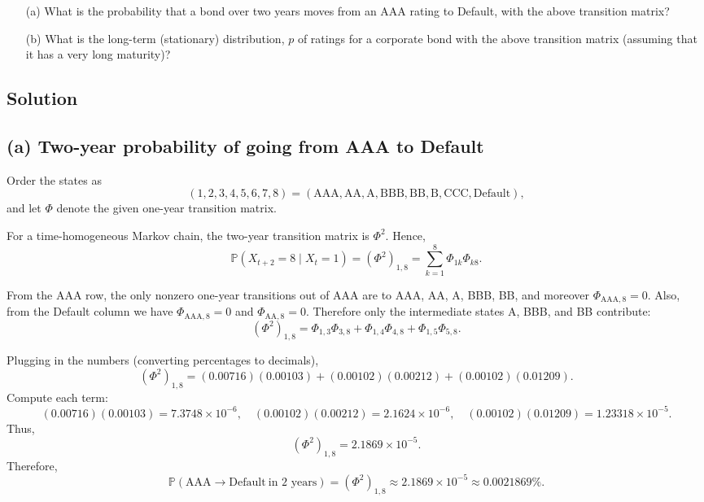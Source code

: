 \documentclass{article}
\begin{document}
\begin{enumerate}

\item[(a)] What is the probability that a bond over two years moves from an AAA rating to Default, with the above transition matrix?

\item[(b)] What is the long-term (stationary) distribution, $p$ of ratings for a corporate bond with the above transition matrix (assuming that it has a very long maturity)?

\end{enumerate}
\bigskip

\subsection*{Solution}

\subsection*{(a) Two-year probability of going from AAA to Default}

Order the states as
\[
(1,2,3,4,5,6,7,8)=(\mathrm{AAA},\mathrm{AA},\mathrm{A},\mathrm{BBB},\mathrm{BB},\mathrm{B},\mathrm{CCC},\mathrm{Default}),
\]
and let $\Phi$ denote the given one-year transition matrix.

For a time-homogeneous Markov chain, the two-year transition matrix is $\Phi^2$. Hence,
\[
\mathbb{P}(X_{t+2}=8\mid X_t=1)=(\Phi^2)_{1,8}
=\sum_{k=1}^8 \Phi_{1k}\Phi_{k8}.
\]

From the AAA row, the only nonzero one-year transitions out of AAA are to
AAA, AA, A, BBB, BB, and moreover $\Phi_{\mathrm{AAA},8}=0$. Also, from the Default column
we have $\Phi_{\mathrm{AAA},8}=0$ and $\Phi_{\mathrm{AA},8}=0$. Therefore only the intermediate
states A, BBB, and BB contribute:
\[
(\Phi^2)_{1,8}
=\Phi_{1,3}\Phi_{3,8}+\Phi_{1,4}\Phi_{4,8}+\Phi_{1,5}\Phi_{5,8}.
\]

Plugging in the numbers (converting percentages to decimals),
\[
(\Phi^2)_{1,8}
=(0.00716)(0.00103) + (0.00102)(0.00212) + (0.00102)(0.01209).
\]
Compute each term:
\[
(0.00716)(0.00103)=7.3748\times 10^{-6},\quad
(0.00102)(0.00212)=2.1624\times 10^{-6},\quad
(0.00102)(0.01209)=1.23318\times 10^{-5}.
\]
Thus,
\[
(\Phi^2)_{1,8}=2.1869\times 10^{-5}.
\]
Therefore,
\[
\boxed{\mathbb{P}(\mathrm{AAA}\to\mathrm{Default}\ \text{in 2 years})
=(\Phi^2)_{1,8}\approx 2.1869\times 10^{-5}\approx 0.0021869\%.}
\]
\end{document}
